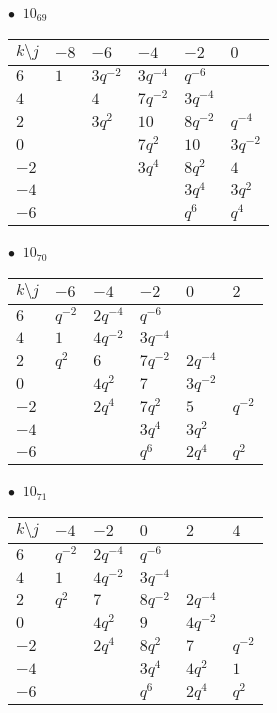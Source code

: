 %
\begin{minipage}{\linewidth}
$\bullet\ $ $10_{69}$ \vspace{0.5em} \\
\begin{tabular}{l|lllll}
$k \setminus j$ & $-8$ & $-6$ & $-4$ & $-2$ & $0$ \\
\hline
$6$ & $1$ & $3q^{-2}$ & $3q^{-4}$ & $q^{-6}$ &  \\
$4$ &  & $4$ & $7q^{-2}$ & $3q^{-4}$ &  \\
$2$ &  & $3q^{2}$ & $10$ & $8q^{-2}$ & $q^{-4}$ \\
$0$ &  &  & $7q^{2}$ & $10$ & $3q^{-2}$ \\
$-2$ &  &  & $3q^{4}$ & $8q^{2}$ & $4$ \\
$-4$ &  &  &  & $3q^{4}$ & $3q^{2}$ \\
$-6$ &  &  &  & $q^{6}$ & $q^{4}$ \\
\end{tabular}
\vspace{2em}
\end{minipage}
%
\begin{minipage}{\linewidth}
$\bullet\ $ $10_{70}$ \vspace{0.5em} \\
\begin{tabular}{l|lllll}
$k \setminus j$ & $-6$ & $-4$ & $-2$ & $0$ & $2$ \\
\hline
$6$ & $q^{-2}$ & $2q^{-4}$ & $q^{-6}$ &  &  \\
$4$ & $1$ & $4q^{-2}$ & $3q^{-4}$ &  &  \\
$2$ & $q^{2}$ & $6$ & $7q^{-2}$ & $2q^{-4}$ &  \\
$0$ &  & $4q^{2}$ & $7$ & $3q^{-2}$ &  \\
$-2$ &  & $2q^{4}$ & $7q^{2}$ & $5$ & $q^{-2}$ \\
$-4$ &  &  & $3q^{4}$ & $3q^{2}$ &  \\
$-6$ &  &  & $q^{6}$ & $2q^{4}$ & $q^{2}$ \\
\end{tabular}
\vspace{2em}
\end{minipage}
%
\begin{minipage}{\linewidth}
$\bullet\ $ $10_{71}$ \vspace{0.5em} \\
\begin{tabular}{l|lllll}
$k \setminus j$ & $-4$ & $-2$ & $0$ & $2$ & $4$ \\
\hline
$6$ & $q^{-2}$ & $2q^{-4}$ & $q^{-6}$ &  &  \\
$4$ & $1$ & $4q^{-2}$ & $3q^{-4}$ &  &  \\
$2$ & $q^{2}$ & $7$ & $8q^{-2}$ & $2q^{-4}$ &  \\
$0$ &  & $4q^{2}$ & $9$ & $4q^{-2}$ &  \\
$-2$ &  & $2q^{4}$ & $8q^{2}$ & $7$ & $q^{-2}$ \\
$-4$ &  &  & $3q^{4}$ & $4q^{2}$ & $1$ \\
$-6$ &  &  & $q^{6}$ & $2q^{4}$ & $q^{2}$ \\
\end{tabular}
\vspace{2em}
\end{minipage}
